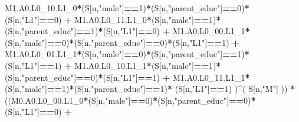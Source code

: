 \documentclass[
]{book}
\newenvironment{Shaded}{\begin{snugshade}}{\end{snugshade}}
\newcommand{\DecValTok}[1]{\textcolor[rgb]{0.00,0.00,0.81}{#1}}
\newcommand{\NormalTok}[1]{#1}
\newcommand{\SpecialCharTok}[1]{\textcolor[rgb]{0.81,0.36,0.00}{\textbf{#1}}}
\newcommand{\StringTok}[1]{\textcolor[rgb]{0.31,0.60,0.02}{#1}}
\begin{document}
\begin{Shaded}
\begin{Highlighting}[]
\NormalTok{          M1.A0.L0\_10.L1\_0}\SpecialCharTok{*}\NormalTok{(S[n,}\StringTok{"male"}\NormalTok{]}\SpecialCharTok{==}\DecValTok{1}\NormalTok{)}\SpecialCharTok{*}\NormalTok{(S[n,}\StringTok{"parent\_educ"}\NormalTok{]}\SpecialCharTok{==}\DecValTok{0}\NormalTok{)}\SpecialCharTok{*}\NormalTok{(S[n,}\StringTok{"L1"}\NormalTok{]}\SpecialCharTok{==}\DecValTok{0}\NormalTok{) }\SpecialCharTok{+} 
\NormalTok{          M1.A0.L0\_11.L1\_0}\SpecialCharTok{*}\NormalTok{(S[n,}\StringTok{"male"}\NormalTok{]}\SpecialCharTok{==}\DecValTok{1}\NormalTok{)}\SpecialCharTok{*}\NormalTok{(S[n,}\StringTok{"parent\_educ"}\NormalTok{]}\SpecialCharTok{==}\DecValTok{1}\NormalTok{)}\SpecialCharTok{*}\NormalTok{(S[n,}\StringTok{"L1"}\NormalTok{]}\SpecialCharTok{==}\DecValTok{0}\NormalTok{) }\SpecialCharTok{+}
\NormalTok{          M1.A0.L0\_00.L1\_1}\SpecialCharTok{*}\NormalTok{(S[n,}\StringTok{"male"}\NormalTok{]}\SpecialCharTok{==}\DecValTok{0}\NormalTok{)}\SpecialCharTok{*}\NormalTok{(S[n,}\StringTok{"parent\_educ"}\NormalTok{]}\SpecialCharTok{==}\DecValTok{0}\NormalTok{)}\SpecialCharTok{*}\NormalTok{(S[n,}\StringTok{"L1"}\NormalTok{]}\SpecialCharTok{==}\DecValTok{1}\NormalTok{) }\SpecialCharTok{+}
\NormalTok{          M1.A0.L0\_01.L1\_1}\SpecialCharTok{*}\NormalTok{(S[n,}\StringTok{"male"}\NormalTok{]}\SpecialCharTok{==}\DecValTok{0}\NormalTok{)}\SpecialCharTok{*}\NormalTok{(S[n,}\StringTok{"parent\_educ"}\NormalTok{]}\SpecialCharTok{==}\DecValTok{1}\NormalTok{)}\SpecialCharTok{*}\NormalTok{(S[n,}\StringTok{"L1"}\NormalTok{]}\SpecialCharTok{==}\DecValTok{1}\NormalTok{) }\SpecialCharTok{+}
\NormalTok{          M1.A0.L0\_10.L1\_1}\SpecialCharTok{*}\NormalTok{(S[n,}\StringTok{"male"}\NormalTok{]}\SpecialCharTok{==}\DecValTok{1}\NormalTok{)}\SpecialCharTok{*}\NormalTok{(S[n,}\StringTok{"parent\_educ"}\NormalTok{]}\SpecialCharTok{==}\DecValTok{0}\NormalTok{)}\SpecialCharTok{*}\NormalTok{(S[n,}\StringTok{"L1"}\NormalTok{]}\SpecialCharTok{==}\DecValTok{1}\NormalTok{) }\SpecialCharTok{+}
\NormalTok{          M1.A0.L0\_11.L1\_1}\SpecialCharTok{*}\NormalTok{(S[n,}\StringTok{"male"}\NormalTok{]}\SpecialCharTok{==}\DecValTok{1}\NormalTok{)}\SpecialCharTok{*}\NormalTok{(S[n,}\StringTok{"parent\_educ"}\NormalTok{]}\SpecialCharTok{==}\DecValTok{1}\NormalTok{)}\SpecialCharTok{*}
\NormalTok{          (S[n,}\StringTok{"L1"}\NormalTok{]}\SpecialCharTok{==}\DecValTok{1}\NormalTok{) )}\SpecialCharTok{\^{}}\NormalTok{( S[n,}\StringTok{"M"}\NormalTok{] )) }\SpecialCharTok{*}
\NormalTok{      ((M0.A0.L0\_00.L1\_0}\SpecialCharTok{*}\NormalTok{(S[n,}\StringTok{"male"}\NormalTok{]}\SpecialCharTok{==}\DecValTok{0}\NormalTok{)}\SpecialCharTok{*}\NormalTok{(S[n,}\StringTok{"parent\_educ"}\NormalTok{]}\SpecialCharTok{==}\DecValTok{0}\NormalTok{)}\SpecialCharTok{*}\NormalTok{(S[n,}\StringTok{"L1"}\NormalTok{]}\SpecialCharTok{==}\DecValTok{0}\NormalTok{) }\SpecialCharTok{+}               

\end{Highlighting}
\end{Shaded}
\end{document}
